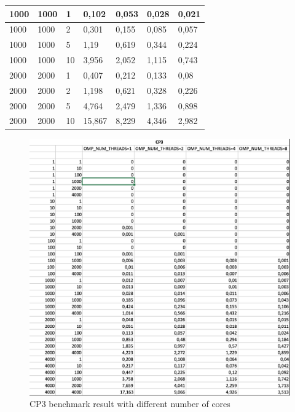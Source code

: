 \documentclass[a4paper,10pt]{article}
\begin{document}
\begin{table}[h]
\begin{tabular}{|l|l|l|l|l|l|l|}
1000                & 1000                 & 1          & 0,102                & 0,053                & 0,028                & 0,021                \\ \hline
1000                & 1000                 & 2          & 0,301                & 0,155                & 0,085                & 0,057                \\ \hline
1000                & 1000                 & 5          & 1,19                 & 0,619                & 0,344                & 0,224                \\ \hline
1000                & 1000                 & 10         & 3,956                & 2,052                & 1,115                & 0,743                \\ \hline
2000                & 2000                 & 1          & 0,407                & 0,212                & 0,133                & 0,08                 \\ \hline
2000                & 2000                 & 2          & 1,198                & 0,621                & 0,328                & 0,226                \\ \hline
2000                & 2000                 & 5          & 4,764                & 2,479                & 1,336                & 0,898                \\ \hline
2000                & 2000                 & 10         & 15,867               & 8,229                & 4,346                & 2,982                \\ \hline
\end{tabular}
\end{table}



\begin{figure}[H]
\centering
\includegraphics[width=1\textwidth]{figures/w2_cp3}
\caption{CP3 benchmark result with different number of cores}
\label{fig:pca_type}
\end{figure}
\end{document}

